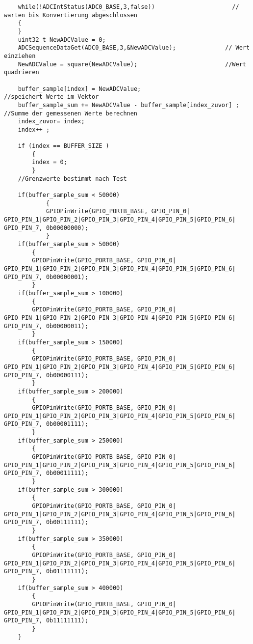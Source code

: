 \begin{lstlisting}
    while(!ADCIntStatus(ADC0_BASE,3,false))                      // warten bis Konvertierung abgeschlossen
    {
    }
    uint32_t NewADCValue = 0;
    ADCSequenceDataGet(ADC0_BASE,3,&NewADCValue);              // Wert einziehen
    NewADCValue = square(NewADCValue);                         //Wert quadrieren

    buffer_sample[index] = NewADCValue;                                 //speichert Werte im Vektor
    buffer_sample_sum += NewADCValue - buffer_sample[index_zuvor] ;     //Summe der gemessenen Werte berechnen
    index_zuvor= index;
    index++ ;

    if (index == BUFFER_SIZE )
        {
        index = 0;
        }
    //Grenzwerte bestimmt nach Test

    if(buffer_sample_sum < 50000)
            {
            GPIOPinWrite(GPIO_PORTB_BASE, GPIO_PIN_0| GPIO_PIN_1|GPIO_PIN_2|GPIO_PIN_3|GPIO_PIN_4|GPIO_PIN_5|GPIO_PIN_6| GPIO_PIN_7, 0b00000000);
            }
    if(buffer_sample_sum > 50000)
        {
        GPIOPinWrite(GPIO_PORTB_BASE, GPIO_PIN_0| GPIO_PIN_1|GPIO_PIN_2|GPIO_PIN_3|GPIO_PIN_4|GPIO_PIN_5|GPIO_PIN_6| GPIO_PIN_7, 0b00000001);
        }
    if(buffer_sample_sum > 100000)
        {
        GPIOPinWrite(GPIO_PORTB_BASE, GPIO_PIN_0| GPIO_PIN_1|GPIO_PIN_2|GPIO_PIN_3|GPIO_PIN_4|GPIO_PIN_5|GPIO_PIN_6| GPIO_PIN_7, 0b00000011);
        }
    if(buffer_sample_sum > 150000)
        {
        GPIOPinWrite(GPIO_PORTB_BASE, GPIO_PIN_0| GPIO_PIN_1|GPIO_PIN_2|GPIO_PIN_3|GPIO_PIN_4|GPIO_PIN_5|GPIO_PIN_6| GPIO_PIN_7, 0b00000111);
        }
    if(buffer_sample_sum > 200000)
        {
        GPIOPinWrite(GPIO_PORTB_BASE, GPIO_PIN_0| GPIO_PIN_1|GPIO_PIN_2|GPIO_PIN_3|GPIO_PIN_4|GPIO_PIN_5|GPIO_PIN_6| GPIO_PIN_7, 0b00001111);
        }
    if(buffer_sample_sum > 250000)
        {
        GPIOPinWrite(GPIO_PORTB_BASE, GPIO_PIN_0| GPIO_PIN_1|GPIO_PIN_2|GPIO_PIN_3|GPIO_PIN_4|GPIO_PIN_5|GPIO_PIN_6| GPIO_PIN_7, 0b00011111);
        }
    if(buffer_sample_sum > 300000)
        {
        GPIOPinWrite(GPIO_PORTB_BASE, GPIO_PIN_0| GPIO_PIN_1|GPIO_PIN_2|GPIO_PIN_3|GPIO_PIN_4|GPIO_PIN_5|GPIO_PIN_6| GPIO_PIN_7, 0b00111111);
        }
    if(buffer_sample_sum > 350000)
        {
        GPIOPinWrite(GPIO_PORTB_BASE, GPIO_PIN_0| GPIO_PIN_1|GPIO_PIN_2|GPIO_PIN_3|GPIO_PIN_4|GPIO_PIN_5|GPIO_PIN_6| GPIO_PIN_7, 0b01111111);
        }
    if(buffer_sample_sum > 400000)
        {
        GPIOPinWrite(GPIO_PORTB_BASE, GPIO_PIN_0| GPIO_PIN_1|GPIO_PIN_2|GPIO_PIN_3|GPIO_PIN_4|GPIO_PIN_5|GPIO_PIN_6| GPIO_PIN_7, 0b11111111);
        }
    }
\end{lstlisting}

